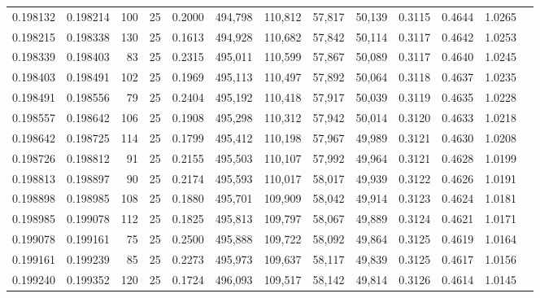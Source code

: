 \begin{tabular}{rrrrrrrrrrrrr}
0.198132 & 0.198214 &   100 &  25 &                                     0.2000 & 494,798 & 110,812 &  57,817 &  50,139 & 0.3115 & 0.4644 & 1.0265 \\
0.198215 & 0.198338 &   130 &  25 &                                     0.1613 & 494,928 & 110,682 &  57,842 &  50,114 & 0.3117 & 0.4642 & 1.0253 \\
0.198339 & 0.198403 &    83 &  25 &                                     0.2315 & 495,011 & 110,599 &  57,867 &  50,089 & 0.3117 & 0.4640 & 1.0245 \\
0.198403 & 0.198491 &   102 &  25 &                                     0.1969 & 495,113 & 110,497 &  57,892 &  50,064 & 0.3118 & 0.4637 & 1.0235 \\
0.198491 & 0.198556 &    79 &  25 &                                     0.2404 & 495,192 & 110,418 &  57,917 &  50,039 & 0.3119 & 0.4635 & 1.0228 \\
0.198557 & 0.198642 &   106 &  25 &                                     0.1908 & 495,298 & 110,312 &  57,942 &  50,014 & 0.3120 & 0.4633 & 1.0218 \\
0.198642 & 0.198725 &   114 &  25 &                                     0.1799 & 495,412 & 110,198 &  57,967 &  49,989 & 0.3121 & 0.4630 & 1.0208 \\
0.198726 & 0.198812 &    91 &  25 &                                     0.2155 & 495,503 & 110,107 &  57,992 &  49,964 & 0.3121 & 0.4628 & 1.0199 \\
0.198813 & 0.198897 &    90 &  25 &                                     0.2174 & 495,593 & 110,017 &  58,017 &  49,939 & 0.3122 & 0.4626 & 1.0191 \\
0.198898 & 0.198985 &   108 &  25 &                                     0.1880 & 495,701 & 109,909 &  58,042 &  49,914 & 0.3123 & 0.4624 & 1.0181 \\
0.198985 & 0.199078 &   112 &  25 &                                     0.1825 & 495,813 & 109,797 &  58,067 &  49,889 & 0.3124 & 0.4621 & 1.0171 \\
0.199078 & 0.199161 &    75 &  25 &                                     0.2500 & 495,888 & 109,722 &  58,092 &  49,864 & 0.3125 & 0.4619 & 1.0164 \\
0.199161 & 0.199239 &    85 &  25 &                                     0.2273 & 495,973 & 109,637 &  58,117 &  49,839 & 0.3125 & 0.4617 & 1.0156 \\
0.199240 & 0.199352 &   120 &  25 &                                     0.1724 & 496,093 & 109,517 &  58,142 &  49,814 & 0.3126 & 0.4614 & 1.0145 \\

\end{tabular}

